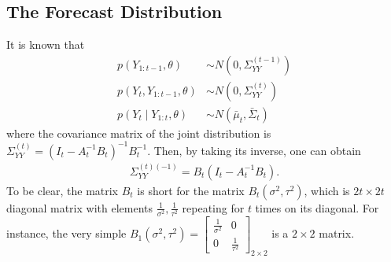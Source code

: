 \subsection{The Forecast Distribution}

It is known that 
\begin{align*}
p(Y_{1:t-1},\theta) &\sim N\left( 0,\Sigma_{YY}^{(t-1)} \right)\\
p(Y_{t},Y_{1:t-1},\theta) &\sim N\left( 0,\Sigma_{YY}^{(t)} \right)\\
p(Y_{t}\mid Y_{1:t},\theta) &\sim N\left( \bar{\mu}_{t},\bar{\Sigma}_{t} \right)
\end{align*}
where the covariance matrix of the joint distribution is $\Sigma_{YY}^{(t)} = \left(I_{t}-A_{t}^{-1}B_{t}\right)^{-1}B_{t}^{-1}$. Then, by taking its inverse, one can obtain 
\begin{align*}
\Sigma_{YY}^{(t) (-1)} = B_{t}(I_{t}-A_{t}^{-1}B_{t}).
\end{align*}
To be clear, the matrix $B_{t}$ is short for the matrix $B_{t}(\sigma^2,\tau^2)$, which is $2t\times 2t$ diagonal matrix with elements $\frac{1}{\sigma^2},\frac{1}{\tau^2}$ repeating for $t$ times on its diagonal. For instance, the very simple $B_1(\sigma^2,\tau^2) = 
\begin{bmatrix}
\frac{1}{\sigma^2} & 0  \\
0 & \frac{1}{\tau^2}
\end{bmatrix}_{2\times 2}$ is a $2\times 2$ matrix. 

